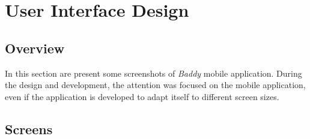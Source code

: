 \documentclass[../../dd.tex]{subfiles}
\begin{document}
    \chapter{User Interface Design}


    \section{Overview}
    In this section are present some screenshots of \textit{Baddy} mobile application.
    During the design and development, the attention was focused on the mobile
    application, even if the application is developed to adapt itself to different screen sizes.


    \section{Screens}
\end{document}
